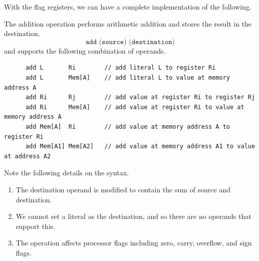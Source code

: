   With the flag registers, we can have a complete implementation of the following. 

  \begin{definition}[Addition]
    The addition operation performs arithmetic addition and stores the result in the destination.
    \begin{equation}
      \texttt{add (source) (destination)}
    \end{equation}
    and supports the following combination of operands.
    \begin{lstlisting}
      add L       Ri        // add literal L to register Ri
      add L       Mem[A]    // add literal L to value at memory address A
      add Ri      Rj        // add value at register Ri to register Rj
      add Ri      Mem[A]    // add value at register Ri to value at memory address A
      add Mem[A]  Ri        // add value at memory address A to register Ri
      add Mem[A1] Mem[A2]   // add value at memory address A1 to value at address A2
    \end{lstlisting}
    Note the following details on the syntax.
    \begin{enumerate}
      \item The destination operand is modified to contain the sum of source and destination.
      \item We cannot set a literal as the destination, and so there are no operands that support this.
      \item The operation affects processor flags including zero, carry, overflow, and sign flags.
    \end{enumerate}
  \end{definition}

  \begin{definition}
    
  \end{definition}

